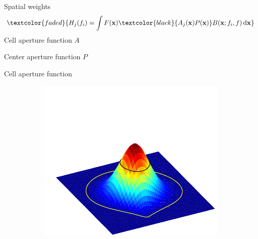 \documentclass[14pt,t]{beamer}
\def\x{\mathbf{x}}
\begin{document}
%
\begin{frame}{Spatial weights}
\begin{align*}
\textcolor{faded}{H_j(f_i) = \int F(\x) \textcolor{black}{A_j (\x) P (\x)} B(\x; f_i,f) \,\text{d} \x}
\end{align*}
Cell aperture function $A$

Center aperture function $P$
\end{frame}
%
\begin{frame}{Cell aperture function}
\begin{figure}
\centering
	\begin{subfigure}[t]{\textwidth}
		\includegraphics[width=\textwidth, clip=true, trim=0 0 0 90]{../defence/img/cellWindowPolar.pdf}
	\end{subfigure}
\end{figure}
\end{frame}
%
\end{document}
